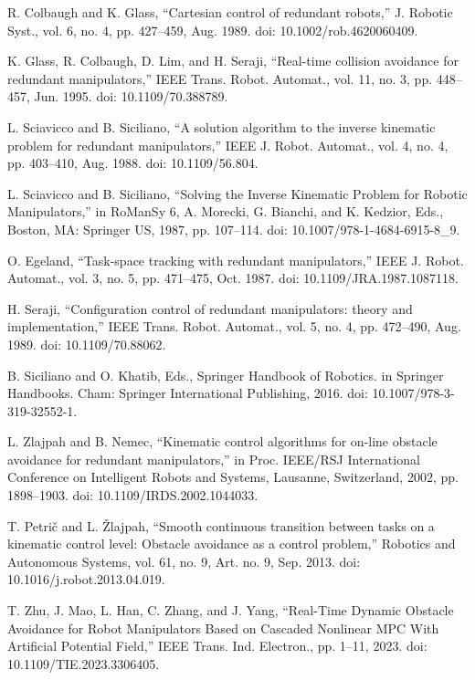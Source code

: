 \documentclass[letterpaper, 10 pt, conference]{ieeeconf}  %
\begin{document}
\begin{thebibliography}{99}
 R. Colbaugh and K. Glass, “Cartesian control of redundant robots,” J. Robotic Syst., vol. 6, no. 4, pp. 427–459, Aug. 1989. doi: 10.1002/rob.4620060409.

 K. Glass, R. Colbaugh, D. Lim, and H. Seraji, “Real-time collision avoidance for redundant manipulators,” IEEE Trans. Robot. Automat., vol. 11, no. 3, pp. 448–457, Jun. 1995. doi: 10.1109/70.388789.



 L. Sciavicco and B. Siciliano, “A solution algorithm to the inverse kinematic problem for redundant manipulators,” IEEE J. Robot. Automat., vol. 4, no. 4, pp. 403–410, Aug. 1988. doi: 10.1109/56.804.

 L. Sciavicco and B. Siciliano, “Solving the Inverse Kinematic Problem for Robotic Manipulators,” in RoManSy 6, A. Morecki, G. Bianchi, and K. Kedzior, Eds., Boston, MA: Springer US, 1987, pp. 107–114. doi: 10.1007/978-1-4684-6915-8\_9.

 O. Egeland, “Task-space tracking with redundant manipulators,” IEEE J. Robot. Automat., vol. 3, no. 5, pp. 471–475, Oct. 1987. doi: 10.1109/JRA.1987.1087118.

 H. Seraji, “Configuration control of redundant manipulators: theory and implementation,” IEEE Trans. Robot. Automat., vol. 5, no. 4, pp. 472–490, Aug. 1989. doi: 10.1109/70.88062.



 B. Siciliano and O. Khatib, Eds., Springer Handbook of Robotics. in Springer Handbooks. Cham: Springer International Publishing, 2016. doi: 10.1007/978-3-319-32552-1.



 L. Zlajpah and B. Nemec, “Kinematic control algorithms for on-line obstacle avoidance for redundant manipulators,” in Proc. IEEE/RSJ International Conference on Intelligent Robots and Systems, Lausanne, Switzerland, 2002, pp. 1898–1903. doi: 10.1109/IRDS.2002.1044033.

 T. Petrič and L. Žlajpah, “Smooth continuous transition between tasks on a kinematic control level: Obstacle avoidance as a control problem,” Robotics and Autonomous Systems, vol. 61, no. 9, Art. no. 9, Sep. 2013. doi: 10.1016/j.robot.2013.04.019.







 T. Zhu, J. Mao, L. Han, C. Zhang, and J. Yang, “Real-Time Dynamic Obstacle Avoidance for Robot Manipulators Based on Cascaded Nonlinear MPC With Artificial Potential Field,” IEEE Trans. Ind. Electron., pp. 1–11, 2023. doi: 10.1109/TIE.2023.3306405.




\end{thebibliography}
\end{document}
